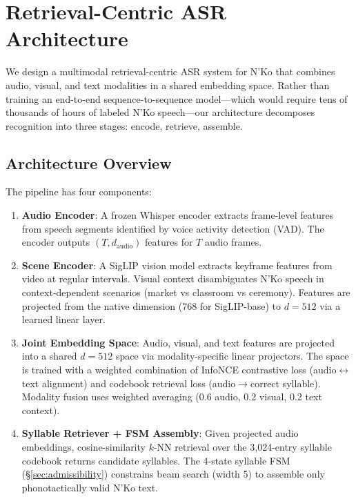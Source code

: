 \documentclass[11pt]{article}
\begin{document}
\section{Retrieval-Centric ASR Architecture}
\label{sec:asr}

We design a multimodal retrieval-centric ASR system for N'Ko that combines audio, visual, and text modalities in a shared embedding space. Rather than training an end-to-end sequence-to-sequence model---which would require tens of thousands of hours of labeled N'Ko speech---our architecture decomposes recognition into three stages: encode, retrieve, assemble.

\subsection{Architecture Overview}

The pipeline has four components:

\begin{enumerate}
\item \textbf{Audio Encoder}: A frozen Whisper encoder extracts frame-level features from speech segments identified by voice activity detection (VAD). The encoder outputs $(T, d_\text{audio})$ features for $T$ audio frames.

\item \textbf{Scene Encoder}: A SigLIP vision model extracts keyframe features from video at regular intervals. Visual context disambiguates N'Ko speech in context-dependent scenarios (market vs classroom vs ceremony). Features are projected from the native dimension (768 for SigLIP-base) to $d = 512$ via a learned linear layer.

\item \textbf{Joint Embedding Space}: Audio, visual, and text features are projected into a shared $d = 512$ space via modality-specific linear projectors. The space is trained with a weighted combination of InfoNCE contrastive loss (audio$\leftrightarrow$text alignment) and codebook retrieval loss (audio$\to$correct syllable). Modality fusion uses weighted averaging (0.6 audio, 0.2 visual, 0.2 text context).

\item \textbf{Syllable Retriever + FSM Assembly}: Given projected audio embeddings, cosine-similarity $k$-NN retrieval over the 3,024-entry syllable codebook returns candidate syllables. The 4-state syllable FSM (\S\ref{sec:admissibility}) constrains beam search (width 5) to assemble only phonotactically valid N'Ko text.
\end{enumerate}
\end{document}

